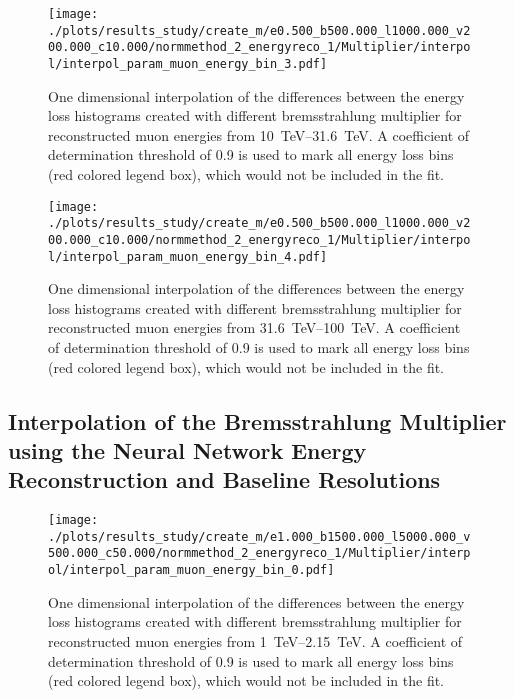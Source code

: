 \begin{figure}[H]
    \centering
    \texttt{[image: ./plots/results\_study/create\_m/e0.500\_b500.000\_l1000.000\_v200.000\_c10.000/normmethod\_2\_energyreco\_1/Multiplier/interpol/interpol\_param\_muon\_energy\_bin\_3.pdf]}
    \caption{One dimensional interpolation of the differences between the energy loss histograms created with different bremsstrahlung multiplier for reconstructed muon energies from \SIrange{10}{31.6}{TeV}. A coefficient of determination threshold of \num{0.9} is used to mark all energy loss bins (red colored legend box), which would not be included in the fit.}
    \label{fig:study_1d_interpol_mu3_nn_high}
\end{figure}

\begin{figure}[H]
    \centering
    \texttt{[image: ./plots/results\_study/create\_m/e0.500\_b500.000\_l1000.000\_v200.000\_c10.000/normmethod\_2\_energyreco\_1/Multiplier/interpol/interpol\_param\_muon\_energy\_bin\_4.pdf]}
    \caption{One dimensional interpolation of the differences between the energy loss histograms created with different bremsstrahlung multiplier for reconstructed muon energies from \SIrange{31.6}{100}{TeV}. A coefficient of determination threshold of \num{0.9} is used to mark all energy loss bins (red colored legend box), which would not be included in the fit.}
    \label{fig:study_1d_interpol_mu4_nn_high}
\end{figure}

%

\subsection{Interpolation of the Bremsstrahlung Multiplier using the Neural Network Energy Reconstruction and Baseline Resolutions}

\begin{figure}[H]
    \centering
    \texttt{[image: ./plots/results\_study/create\_m/e1.000\_b1500.000\_l5000.000\_v500.000\_c50.000/normmethod\_2\_energyreco\_1/Multiplier/interpol/interpol\_param\_muon\_energy\_bin\_0.pdf]}
    \caption{One dimensional interpolation of the differences between the energy loss histograms created with different bremsstrahlung multiplier for reconstructed muon energies from \SIrange{1}{2.15}{TeV}. A coefficient of determination threshold of \num{0.9} is used to mark all energy loss bins (red colored legend box), which would not be included in the fit.}
    \label{fig:study_1d_interpol_mu0_nn_base}
\end{figure}

